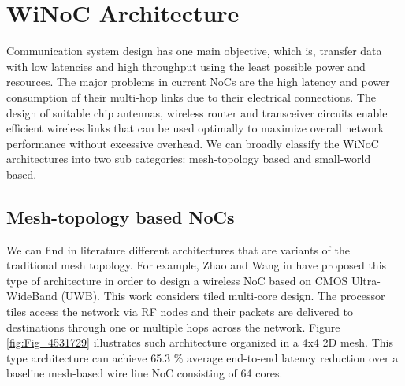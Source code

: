 \documentclass[12pt]{article}
\begin{document}
\section{WiNoC Architecture}

Communication system design has one main objective, which is, transfer data with low latencies and high throughput using the least possible power and resources. The major problems in current NoCs are the high latency and power consumption of their multi-hop links due to their electrical connections. The design of suitable chip antennas, wireless router and transceiver circuits enable efficient wireless links that can be used optimally to maximize overall network performance without excessive overhead. We can broadly classify the WiNoC architectures into two sub categories: mesh-topology based and small-world based.

\subsection{Mesh-topology based NoCs}



We can find in literature different architectures that are variants of the traditional mesh topology. For example, Zhao and Wang in \citep{4531729} have proposed this type of architecture in order to design a wireless NoC based on CMOS Ultra-WideBand (UWB). This work considers tiled multi-core design. The processor tiles access the network via RF nodes and their packets are delivered to destinations through one or multiple hops across the network. Figure \ref{fig:Fig_4531729} illustrates such architecture organized in a 4x4 2D mesh. This type architecture can achieve 65.3 \% average end-to-end latency reduction over a baseline mesh-based wire line NoC consisting of 64 cores.
\end{document}
